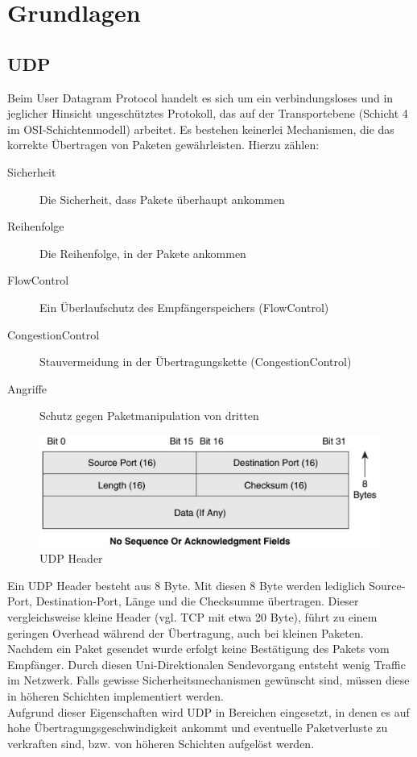 \chapter{Grundlagen}
\label{ch:Grundlagen}


\section{UDP}

Beim User Datagram Protocol handelt es sich um ein verbindungsloses und in jeglicher Hinsicht ungeschütztes Protokoll, das auf der Transportebene (Schicht 4 im OSI-Schichtenmodell) arbeitet. Es bestehen keinerlei Mechanismen, die das korrekte Übertragen von Paketen gewährleisten. Hierzu zählen:

\begin{description}
	\item[Sicherheit] Die Sicherheit, dass Pakete überhaupt ankommen
	\item[Reihenfolge] Die Reihenfolge, in der Pakete ankommen
	\item[FlowControl] Ein Überlaufschutz des Empfängerspeichers (FlowControl)
	\item[CongestionControl] Stauvermeidung in der Übertragungskette (CongestionControl)
	\item[Angriffe] Schutz gegen Paketmanipulation von dritten
\end{description}

\begin{figure}
\includegraphics[width=\textwidth]{images/UDP_header.pdf}
\caption{UDP Header}
\label{fig:udp_header}
\end{figure}

Ein UDP Header besteht aus 8 Byte. Mit diesen 8 Byte werden lediglich Source-Port, Destination-Port, Länge und die Checksumme übertragen. Dieser vergleichsweise kleine Header (vgl. TCP mit etwa 20 Byte), führt zu einem geringen Overhead während der Übertragung, auch bei kleinen Paketen. Nachdem ein Paket gesendet wurde erfolgt keine Bestätigung des Pakets vom Empfänger. Durch diesen Uni-Direktionalen Sendevorgang entsteht wenig Traffic im Netzwerk. Falls gewisse Sicherheitsmechanismen gewünscht sind, müssen diese in höheren Schichten implementiert werden. \\
Aufgrund dieser Eigenschaften wird UDP in Bereichen eingesetzt, in denen es auf hohe Übertragungsgeschwindigkeit ankommt und eventuelle Paketverluste zu verkraften sind, bzw. von höheren Schichten aufgelöst werden.



